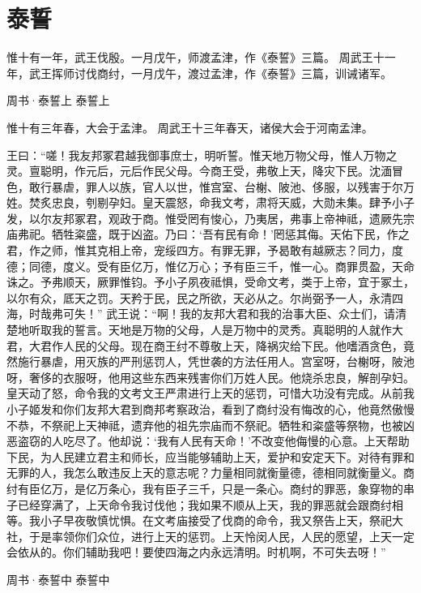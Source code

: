 \documentclass[a4paper,12pt,UTF8,twoside]{ctexbook}
\begin{document}
\chapter{泰誓}

惟十有一年，武王伐殷。一月戊午，师渡孟津，作《泰誓》三篇。
周武王十一年，武王挥师讨伐商纣，一月戊午，渡过孟津，作《泰誓》三篇，训诫诸军。

周书·泰誓上
泰誓上

惟十有三年春，大会于孟津。
周武王十三年春天，诸侯大会于河南孟津。

王曰：“嗟！我友邦冢君越我御事庶士，明听誓。惟天地万物父母，惟人万物之灵。亶聪明，作元后，元后作民父母。今商王受，弗敬上天，降灾下民。沈湎冒色，敢行暴虐，罪人以族，官人以世，惟宫室、台榭、陂池、侈服，以残害于尔万姓。焚炙忠良，刳剔孕妇。皇天震怒，命我文考，肃将天威，大勋未集。肆予小子发，以尔友邦冢君，观政于商。惟受罔有悛心，乃夷居，弗事上帝神祗，遗厥先宗庙弗祀。牺牲粢盛，既于凶盗。乃曰：‘吾有民有命！’罔惩其侮。天佑下民，作之君，作之师，惟其克相上帝，宠绥四方。有罪无罪，予曷敢有越厥志？同力，度德；同德，度义。受有臣亿万，惟亿万心；予有臣三千，惟一心。商罪贯盈，天命诛之。予弗顺天，厥罪惟钧。予小子夙夜祗惧，受命文考，类于上帝，宜于冢土，以尔有众，厎天之罚。天矜于民，民之所欲，天必从之。尔尚弼予一人，永清四海，时哉弗可失！”
武王说：“啊！我的友邦大君和我的治事大臣、众士们，请清楚地听取我的誓言。天地是万物的父母，人是万物中的灵秀。真聪明的人就作大君，大君作人民的父母。现在商王纣不尊敬上天，降祸灾给下民。他嗜酒贪色，竟然施行暴虐，用灭族的严刑惩罚人，凭世袭的方法任用人。宫室呀，台榭呀，陂池呀，奢侈的衣服呀，他用这些东西来残害你们万姓人民。他烧杀忠良，解剖孕妇。皇天动了怒，命令我的文考文王严肃进行上天的惩罚，可惜大功没有完成。从前我小子姬发和你们友邦大君到商邦考察政治，看到了商纣没有悔改的心，他竟然傲慢不恭，不祭祀上天神祗，遗弃他的祖先宗庙而不祭祀。牺牲和粢盛等祭物，也被凶恶盗窃的人吃尽了。他却说：‘我有人民有天命！’不改变他侮慢的心意。上天帮助下民，为人民建立君主和师长，应当能够辅助上天，爱护和安定天下。对待有罪和无罪的人，我怎么敢违反上天的意志呢？力量相同就衡量德，德相同就衡量义。商纣有臣亿万，是亿万条心，我有臣子三千，只是一条心。商纣的罪恶，象穿物的串子已经穿满了，上天命令我讨伐他；我如果不顺从上天，我的罪恶就会跟商纣相等。我小子早夜敬慎忧惧。在文考庙接受了伐商的命令，我又祭告上天，祭祀大社，于是率领你们众位，进行上天的惩罚。上天怜闵人民，人民的愿望，上天一定会依从的。你们辅助我吧！要使四海之内永远清明。时机啊，不可失去呀！”

周书·泰誓中
泰誓中
\end{document}
